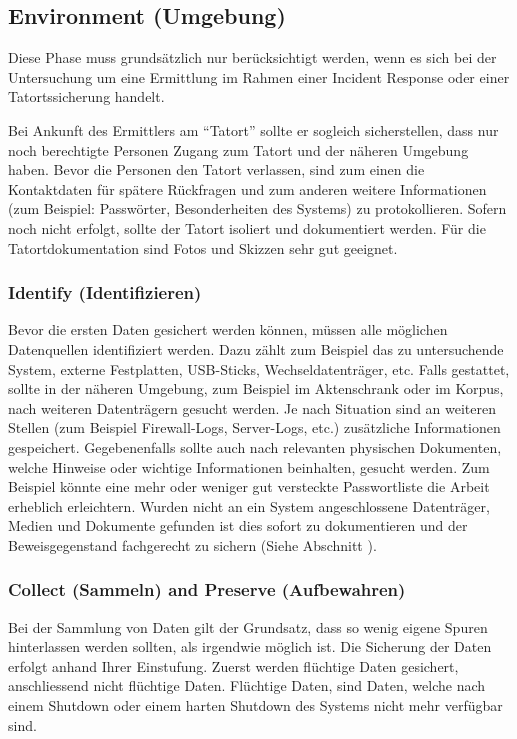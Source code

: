 \subsection{Environment (Umgebung)}
Diese Phase muss grundsätzlich nur berücksichtigt werden, wenn es sich bei der Untersuchung um eine Ermittlung im Rahmen einer Incident Response oder einer Tatortssicherung handelt.

Bei Ankunft des Ermittlers am "`Tatort"' sollte er sogleich sicherstellen, dass nur noch berechtigte Personen Zugang zum Tatort und der näheren Umgebung haben. Bevor die Personen den Tatort verlassen, sind zum einen die Kontaktdaten für spätere Rückfragen und zum anderen weitere Informationen (zum Beispiel: Passwörter, Besonderheiten des Systems) zu protokollieren. Sofern noch nicht erfolgt, sollte der Tatort isoliert und dokumentiert werden. Für die Tatortdokumentation sind Fotos und Skizzen sehr gut geeignet.

\subsubsection{Identify (Identifizieren)}
Bevor die ersten Daten gesichert werden können, müssen alle möglichen Datenquellen identifiziert werden. Dazu zählt zum Beispiel das zu untersuchende System, externe Festplatten, USB-Sticks, Wechseldatenträger, etc. Falls gestattet, sollte in der näheren Umgebung, zum Beispiel im Aktenschrank oder im Korpus, nach weiteren Datenträgern gesucht werden. Je nach Situation sind an weiteren Stellen (zum Beispiel Firewall-Logs, Server-Logs, etc.) zusätzliche Informationen gespeichert. Gegebenenfalls sollte auch nach relevanten physischen Dokumenten, welche Hinweise oder wichtige Informationen beinhalten, gesucht werden. Zum Beispiel könnte eine mehr oder weniger gut versteckte Passwortliste die Arbeit erheblich erleichtern. Wurden nicht an ein System angeschlossene Datenträger, Medien  und Dokumente gefunden ist dies sofort zu dokumentieren und der Beweisgegenstand fachgerecht zu sichern (Siehe Abschnitt ). 

\subsubsection{Collect (Sammeln) and Preserve (Aufbewahren)} \label{subsubsec:FA:Secure:CollectPreserve}
Bei der Sammlung von Daten gilt der Grundsatz, dass so wenig eigene Spuren hinterlassen werden sollten, als irgendwie möglich ist. Die Sicherung der Daten erfolgt anhand Ihrer Einstufung. Zuerst werden flüchtige Daten gesichert, anschliessend nicht flüchtige Daten. Flüchtige Daten, sind Daten, welche nach einem Shutdown oder einem harten Shutdown des Systems nicht mehr verfügbar sind.


